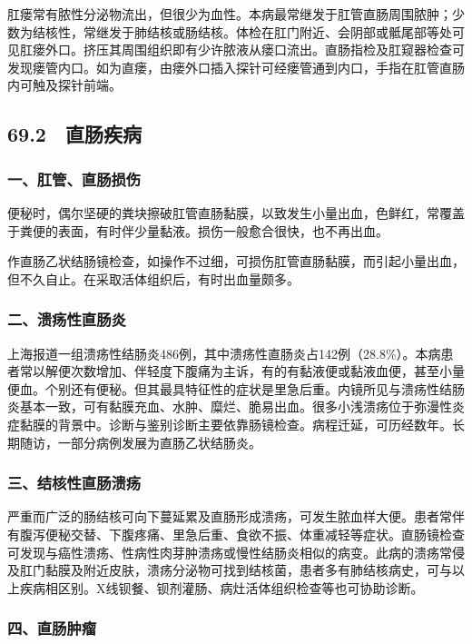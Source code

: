 肛瘘常有脓性分泌物流出，但很少为血性。本病最常继发于肛管直肠周围脓肿；少数为结核性，常继发于肺结核或肠结核。体检在肛门附近、会阴部或骶尾部等处可见肛瘘外口。挤压其周围组织即有少许脓液从瘘口流出。直肠指检及肛窥器检查可发现瘘管内口。如为直瘘，由瘘外口插入探针可经瘘管通到内口，手指在肛管直肠内可触及探针前端。

\protect\hypertarget{text00175.html}{}{}

\subsection{69.2　直肠疾病}

\subsubsection{一、肛管、直肠损伤}

便秘时，偶尔坚硬的粪块擦破肛管直肠黏膜，以致发生小量出血，色鲜红，常覆盖于粪便的表面，有时伴少量黏液。损伤一般愈合很快，也不再出血。

作直肠乙状结肠镜检查，如操作不过细，可损伤肛管直肠黏膜，而引起小量出血，但不久自止。在采取活体组织后，有时出血量颇多。

\subsubsection{二、溃疡性直肠炎}

上海报道一组溃疡性结肠炎486例，其中溃疡性直肠炎占142例（28.8\%）。本病患者常以解便次数增加、伴轻度下腹痛为主诉，有的有黏液便或黏液血便，甚至小量便血。个别还有便秘。但其最具特征性的症状是里急后重。内镜所见与溃疡性结肠炎基本一致，可有黏膜充血、水肿、糜烂、脆易出血。很多小浅溃疡位于弥漫性炎症黏膜的背景中。诊断与鉴别诊断主要依靠肠镜检查。病程迁延，可历经数年。长期随访，一部分病例发展为直肠乙状结肠炎。

\subsubsection{三、结核性直肠溃疡}

严重而广泛的肠结核可向下蔓延累及直肠形成溃疡，可发生脓血样大便。患者常伴有腹泻便秘交替、下腹疼痛、里急后重、食欲不振、体重减轻等症状。直肠镜检查可发现与癌性溃疡、性病性肉芽肿溃疡或慢性结肠炎相似的病变。此病的溃疡常侵及肛门黏膜及附近皮肤，溃疡分泌物可找到结核菌，患者多有肺结核病史，可与以上疾病相区别。X线钡餐、钡剂灌肠、病灶活体组织检查等也可协助诊断。

\subsubsection{四、直肠肿瘤}

